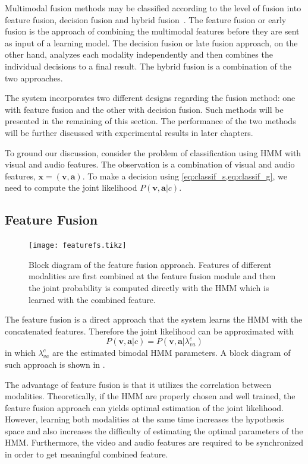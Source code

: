 \documentclass[letterpaper, 10 pt, conference]{ieeeconf}  %
\begin{document}
Multimodal fusion methods may be classified according to the level of fusion into feature fusion, decision fusion and hybrid fusion~\cite{atrey_multimodal_2010}. The feature fusion or early fusion is the approach of combining the multimodal features before they are sent as input of a learning model. The decision fusion or late fusion approach, on the other hand, analyzes each modality independently and then combines the individual decisions to a final result. The hybrid fusion is a combination of the two approaches.

The system incorporates two different designs regarding the fusion method: one with feature fusion and the other with decision fusion. Such methods will be presented in the remaining of this section. The performance of the two methods will be further discussed with experimental results in later chapters.

To ground our discussion, consider the problem of classification using HMM with visual and audio features. The observation is a combination of visual and audio features, $\mathbf{x} = (\mathbf{v}, \mathbf{a})$. To make a decision using \cref{eq:classif_s,eq:classif_g}, we need to compute the joint likelihood $P(\mathbf{v},\mathbf{a}|c)$.

\subsection{Feature Fusion}
\begin{figure}[t]
  \footnotesize
  \centering
  \texttt{[image: featurefs.tikz]}
  \caption[Block diagram of the feature fusion approach.]{Block diagram of the feature fusion approach. Features of different modalities are first combined at the feature fusion module and then the joint probability is computed directly with the HMM which is learned with the combined feature.}
  \label{fig:featuref}
\end{figure}

The feature fusion is a direct approach that the system learns the HMM with the concatenated features. Therefore the joint likelihood can be approximated with 
\begin{equation}
  P(\mathbf{v},\mathbf{a}|c) = P(\mathbf{v},\mathbf{a}|\lambda_{va}^c)
\end{equation}
in which $\lambda_{va}^c$ are the estimated bimodal HMM parameters. A block diagram of such approach is shown in .

The advantage of feature fusion is that it utilizes the correlation between modalities. Theoretically, if the HMM are properly chosen and well trained, the feature fusion approach can yields optimal estimation of the joint likelihood. However, learning both modalities at the same time increases the hypothesis space and also increases the difficulty of estimating the optimal parameters of the HMM. Furthermore, the video and audio features are required to be synchronized in order to get meaningful combined feature.
\end{document}
